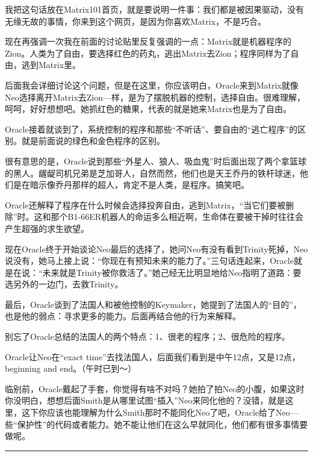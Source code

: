 \documentclass{ctexart}
\newcommand{\myparsep}{\noindent \rule[0.5ex]{\linewidth}{1pt}}
\begin{document}
我把这句话放在Matrix101首页，就是要说明一件事：我们都是被因果驱动，没有无缘无故的事情，你来到这个网页，是因为你喜欢Matrix，不是巧合。

现在再强调一次我在前面的讨论贴里反复强调的一点：Matrix就是机器程序的Zion。人类为了自由，要选择红色的药丸，逃出Matrix去Zion；程序同样为了自由，逃到Matrix里。

后面我会详细讨论这个问题，但是在这里，你应该明白，Oracle来到Matrix就像Neo选择离开Matrix去Zion—样，是为了摆脱机器的控制，选择自由。很难理解，呵呵，好好想想吧。她抓红色的糖果，代表的就是她来Matrix也是为了自由。

Oracle接着就谈到了，系统控制的程序和那些“不听话”、要自由的“逃亡程序”的区别。就是前面说的绿色和金色程序的区别。

很有意思的是，Oracle说到那些“外星人、狼人、吸血鬼”时后面出现了两个拿篮球的黑人。龌龊司机兄弟是芝加哥人，自然而然，他们也是天王乔丹的铁杆球迷，他们是在暗示像乔丹那样的超人，肯定不是人类，是程序。搞笑吧。

Oracle还解释了程序在什么时候会选择投奔自由，逃到Matrix，“当它们要被删除”时。这和那个B1-66ER机器人的命运多么相近啊，生命体在要被干掉时往往会产生超强的求生欲望。

现在Oracle终于开始谈论Neo最后的选择了，她问Neo有没有看到Trinity死掉，Neo说没有，她马上接上说：“你现在有预知未来的能力了。”三句话连起来，Oracle就是在说：“未来就是Trinity被你救活了。”她己经无比明显地给Neo指明了道路：要选另外的一边门，去救Trinity。

最后，Oracle谈到了法国人和被他控制的Keymaker，她提到了法国人的“目的”，也是他的弱点：寻求更多的能力。后面再结合他的行为来解释。

别忘了Oracle总结的法国人的两个特点：1、很老的程序；2、很危险的程序。

Oracle让Neo在“exact time”去找法国人，后面我们看到是中午12点，又是12点，beginning and end。（午时已到～）

临别前，Oracle戴起了手套，你觉得有啥不对吗？她拍了拍Neo的小腹，如果这时你没明白，想想后面Smith是从哪里试图“插入”Neo来同化他的？没错，就是这里，这下你应该也能理解为什么Smith那时不能同化Neo了吧，Oracle给了Neo—些“保护性”的代码或者能力。她不能让他们在这么早就同化，他们都有很多事情要做呢。

\myparsep
\end{document}
